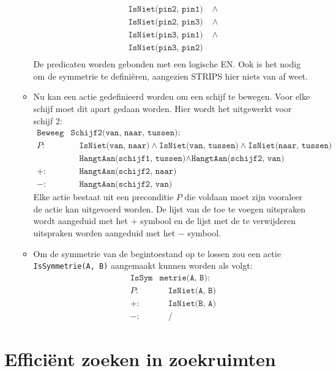 \begin{itemize}
\begin{itemize}
\begin{equation*}
\begin{split}
				\texttt{IsNiet(pin2, pin1)}& \;\wedge \\
				\texttt{IsNiet(pin2, pin3)}& \;\wedge \\
				\texttt{IsNiet(pin3, pin1)}& \;\wedge \\
				\texttt{IsNiet(pin3, pin2)}&  \\
			\end{split}
		\end{equation*}
		De predicaten worden gebonden met een logische EN. Ook is het nodig om de symmetrie te definiëren, aangezien STRIPS hier niets van af weet.
		\item Nu kan een actie gedefinieerd worden om een schijf te bewegen. Voor elke schijf moet dit apart gedaan worden. Hier wordt het uitgewerkt voor schijf 2:
		\begin{equation*}
			\begin{split}
				\texttt{Beweeg}&\texttt{Schijf2(van, naar, tussen)}: \\ 
				P : &\quad\texttt{IsNiet(van, naar)} \wedge \texttt{IsNiet(van, tussen)} \wedge \texttt{IsNiet(naar, tussen)}  \\
				    &\quad \texttt{HangtAan(schijf1, tussen)} \wedge \texttt{HangtAan(schijf2, van)} \\
				+ : &\quad \texttt{HangtAan(schijf2, naar)}\\
				- : &\quad \texttt{HangtAan(schijf2, van)}
			\end{split}
		\end{equation*}
		Elke actie bestaat uit een preconditie $P$ die voldaan moet zijn vooraleer de actie kan uitgevoerd worden. De lijst van de toe te voegen uitspraken wordt aangeduid met het $+$ symbool en de lijst met de te verwijderen uitspraken worden aangeduid met het $-$ symbool.
		\item Om de symmetrie van de begintoestand op te lossen zou een actie \texttt{IsSymmetrie(A, B)} aangemaakt kunnen worden als volgt:
		\begin{equation*}
			\begin{split}
				\texttt{IsSym}&\texttt{metrie(A, B)}: \\ 
				P : &\quad \texttt{IsNiet(A, B)}\\
				+ : &\quad \texttt{IsNiet(B, A)}\\
				- : &\quad /
			\end{split}
		\end{equation*}
	\end{itemize}
\end{itemize}
\section{Efficiënt zoeken in zoekruimten}
